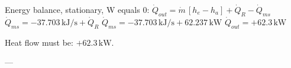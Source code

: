 Energy balance, stationary, W equals 0:  
\( \dot{Q}_{out} = \dot{m} \, [h_e - h_a] + \dot{Q}_R - \dot{Q}_{ms} \)  
\( \dot{Q}_{ms} = -37.703 \, \text{kJ/s} + \dot{Q}_R \)  
\( \dot{Q}_{ms} = -37.703 \, \text{kJ/s} + 62.237 \, \text{kW} \)  
\( \dot{Q}_{out} = +62.3 \, \text{kW} \)  

Heat flow must be: \( +62.3 \, \text{kW} \).  

---